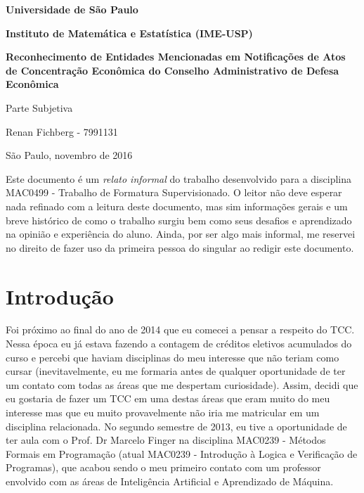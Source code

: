 \documentclass[11pt]{report}
\begin{document}
\begin{center}
{\LARGE \textbf{Universidade de São Paulo}}
\vspace*{10px}

{\LARGE \textbf{Instituto de Matemática e Estatística (IME-USP)}}
\vspace*{40px}

{\Large \textbf{Reconhecimento de Entidades Mencionadas em Notificações de Atos de Concentração Econômica do Conselho Administrativo de Defesa Econômica}}
\vspace*{20px}

{\Large Parte Subjetiva}

\vspace*{20px}
{\large Renan Fichberg - 7991131}

\vspace*{15px}
{\large São Paulo, novembro de 2016}
\end{center}

Este documento é um \textit{relato informal} do trabalho desenvolvido para a disciplina MAC0499 - Trabalho de Formatura Supervisionado.
O leitor não deve esperar nada refinado com a leitura deste documento, mas sim informações gerais e um breve histórico de como o trabalho surgiu
bem como seus desafios e aprendizado na opinião e experiência do aluno. Ainda, por ser algo mais informal, me reservei no direito de fazer uso
da primeira pessoa do singular ao redigir este documento.

\section*{Introdução}

\indent\indent Foi próximo ao final do ano de 2014 que eu comecei a pensar a respeito do TCC.
Nessa época eu já estava fazendo a contagem de créditos eletivos acumulados do curso e percebi que haviam
disciplinas do meu interesse que não teriam como cursar (inevitavelmente, eu me formaria antes de
qualquer oportunidade de ter um contato com todas as áreas que me despertam curiosidade). Assim,
decidi que eu gostaria de fazer um TCC em uma destas áreas que eram muito do meu interesse mas que
eu muito provavelmente não iria me matricular em um disciplina relacionada.
No segundo semestre de 2013, eu tive a oportunidade de ter aula com o Prof. Dr Marcelo Finger na disciplina
MAC0239 - Métodos Formais em Programação (atual MAC0239 - Introdução à Logica e Verificação de Programas), que
acabou sendo o meu primeiro contato com um professor envolvido com as áreas de Inteligência Artificial e Aprendizado
de Máquina.
\end{document}
